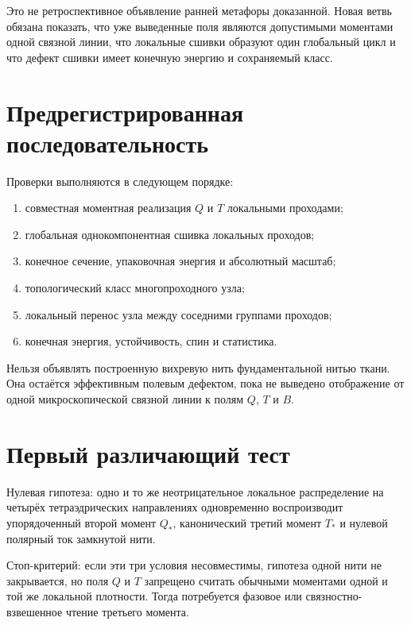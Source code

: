 Это не ретроспективное объявление ранней метафоры доказанной. Новая ветвь
обязана показать, что уже выведенные поля являются допустимыми моментами
одной связной линии, что локальные сшивки образуют один глобальный цикл и
что дефект сшивки имеет конечную энергию и сохраняемый класс.

\section{Предрегистрированная последовательность}

Проверки выполняются в следующем порядке:
\begin{enumerate}
 \item совместная моментная реализация $Q$ и $T$ локальными проходами;
 \item глобальная однокомпонентная сшивка локальных проходов;
 \item конечное сечение, упаковочная энергия и абсолютный масштаб;
 \item топологический класс многопроходного узла;
 \item локальный перенос узла между соседними группами проходов;
 \item конечная энергия, устойчивость, спин и статистика.
\end{enumerate}

\begin{nogocriterion}
Нельзя объявлять построенную вихревую нить фундаментальной нитью ткани.
Она остаётся эффективным полевым дефектом, пока не выведено отображение от
одной микроскопической связной линии к полям $Q$, $T$ и $B$.
\end{nogocriterion}

\section{Первый различающий тест}

Нулевая гипотеза: одно и то же неотрицательное локальное распределение
на четырёх тетраэдрических направлениях одновременно воспроизводит
упорядоченный второй момент $Q_*$, канонический третий момент $T_*$ и
нулевой полярный ток замкнутой нити.

Стоп-критерий: если эти три условия несовместимы, гипотеза одной нити не
закрывается, но поля $Q$ и $T$ запрещено считать обычными моментами одной
и той же локальной плотности. Тогда потребуется фазовое или
связностно-взвешенное чтение третьего момента.

